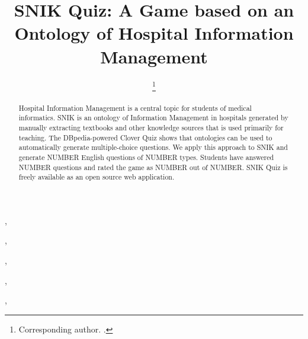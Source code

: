 \documentclass[sw]{iosart2x}
\begin{document}
\begin{frontmatter}

\title{SNIK Quiz: A Game based on an Ontology of Hospital Information Management}

\author[A]{ %
\thanks{Corresponding author. .}},
\author[A]{ },
\author[A]{ },
\author[A]{ },
\author[A]{ },
\author[A]{ }
\address[A]{Institute for Medical Informatics, Statistics and Epidemiology (IMISE),
, }

\begin{abstract}
Hospital Information Management is a central topic for students of medical informatics.
SNIK is an ontology of Information Management in hospitals generated by manually extracting textbooks and other knowledge sources that is used primarily for teaching.
The DBpedia-powered Clover Quiz shows that ontologies can be used to automatically generate multiple-choice questions.
We apply this approach to SNIK and generate NUMBER English questions of NUMBER types.
Students have answered NUMBER questions and rated the game as NUMBER out of NUMBER.
SNIK Quiz is freely available as an open source web application.
\end{abstract}


\begin{keyword}
\end{keyword}

\end{frontmatter}
\end{document}

